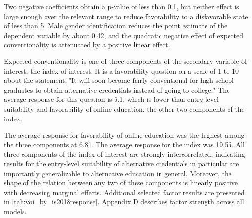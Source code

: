 \documentclass[AER]{./aea-latex-templates/AEA}
\begin{document}
        Two negative coefficients obtain a p-value of less than 0.1, but neither effect is
        large enough over the relevant range to reduce favorability to a disfavorable
        state of less than 5. Male gender identification reduces the point estimate of the
        dependent variable by about 0.42, and the quadratic negative effect of expected
        conventionality is attenuated by a positive linear effect.

        Expected conventionality is one of three components of the secondary variable of interest, the index of interest.
        It is a favorability question on a scale of 1 to 10 about the statement,
        "It will soon become fairly conventional for high school graduates to obtain alternative credentials instead of going to college."
        The average response for this question is 6.1, which is lower than entry-level
        suitability and favorability of online education, the other two components of the index.

        The average response for favorability of online education was the highest among the three components at 6.81.
        The average response for the index was 19.55.
        All three components of the index of interest are strongly intercorrelated,
        indicating results for the entry-level suitability of alternative credentials
        in particular are importantly generalizable to alternative education in general.
        Moreover, the shape of the relation between any two of these components is
        linearly positive with decreasing marginal effects.
        Additional selected factor results are presented in \ref{tab:voi_by_is2018response}.
        Appendix D describes factor strength across all models.
        
\end{document}
